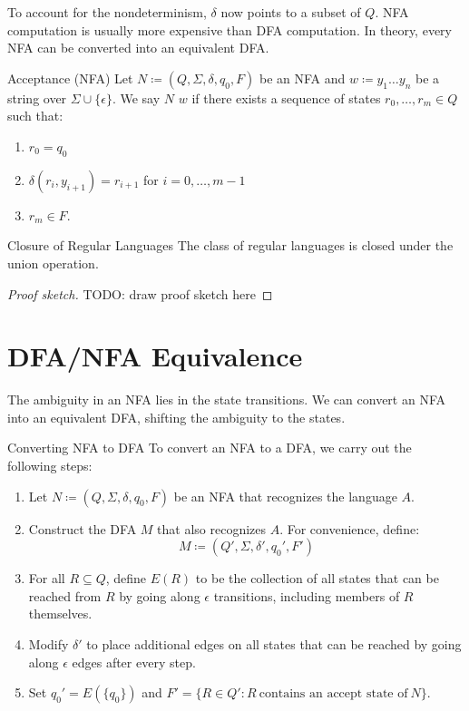 \documentclass[12pt]{report}
\begin{document}
To account for the nondeterminism, $\delta$ now points to a subset of $Q$. NFA computation is usually more expensive than DFA computation. In theory, every NFA can be converted into an equivalent DFA.

\begin{dfnbox}{Acceptance (NFA)}{}
    Let $N \coloneq (Q, \Sigma, \delta, q_0, F)$ be an NFA and $w \coloneq y_1 \ldots y_n$ be a string over $\Sigma \cup \{\epsilon\}$. We say $N$  $w$ if there exists a sequence of states $r_0, \ldots, r_m \in Q$ such that:
    \begin{enumerate}[noitemsep]
        \item $r_0 = q_0$
        \item $\delta(r_i, y_{i+1}) = r_{i+1}$ for $i = 0, \ldots, m-1$
        \item $r_m \in F$.
    \end{enumerate}
\end{dfnbox}

\begin{thmbox}{Closure of Regular Languages}{}
    The class of regular languages is closed under the union operation.
    \tcblower
    \begin{proof}[Proof sketch]
        TODO: draw proof sketch here
    \end{proof}
\end{thmbox}

\section{DFA/NFA Equivalence}

The ambiguity in an NFA lies in the state transitions. We can convert an NFA into an equivalent DFA, shifting the ambiguity to the states.

\begin{tecbox}{Converting NFA to DFA}{}
    To convert an NFA to a DFA, we carry out the following steps:
    \begin{enumerate}
        \item Let $N \coloneq (Q, \Sigma, \delta, q_0, F)$ be an NFA that recognizes the language $A$.
        \item Construct the DFA $M$ that also recognizes $A$. For convenience, define:
        \[ M \coloneq (Q\prime, \Sigma, \delta\prime, q_0\prime, F\prime) \]
        \item For all $R \subseteq Q$, define $E(R)$ to be the collection of all states that can be reached from $R$ by going along $\epsilon$ transitions, including members of $R$ themselves.
        \item Modify $\delta\prime$ to place additional edges on all states that can be reached by going along $\epsilon$ edges after every step.
        \item Set $q_0\prime = E(\{q_0\})$ and $F\prime = \{ R \in Q\prime : R\ \text{contains an accept state of}\ N \}$.
    \end{enumerate}
\end{tecbox}

\amzindex
\end{document}
